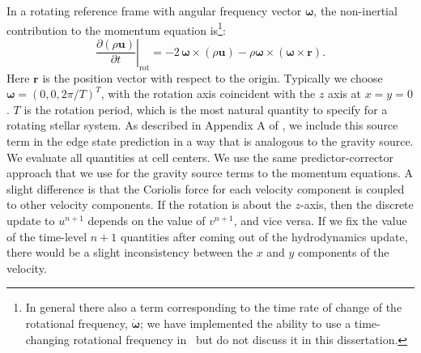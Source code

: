\documentclass[12pt]{article}
\begin{document}
In a rotating reference frame with angular frequency vector $\bm{\omega}$,
the non-inertial contribution to the momentum equation is\footnote{In general there
also a term corresponding to the time rate of change of the rotational frequency,
$\dot{\bm{\omega}}$; we have implemented the ability to use a time-changing
rotational frequency in \castro\ but do not discuss it in this dissertation.}:
\begin{equation}
  \left.\frac{\partial(\rho \mathbf{u})}{\partial t}\right|_{\text{rot}} = -2\, {\bm\omega} \times (\rho\mathbf{u}) - \rho {\bm\omega} \times \left({\bm\omega} \times \mathbf{r}\right).
\end{equation}
Here $\mathbf{r}$ is the position vector with respect to the origin. Typically we choose $\bm{\omega} = (0, 0, 2\pi / T)^T$,
with the rotation axis coincident with the $z$ axis at $x = y = 0$.
$T$ is the rotation period, which is the most natural quantity to specify
for a rotating stellar system. As described in Appendix A of \cite{wdmergerI}, we include this source term
in the edge state prediction in a way that is analogous to the gravity source.
We evaluate all quantities at cell centers. We use the same predictor-corrector
approach that we use for the gravity source terms to the momentum equations. A slight
difference is that the Coriolis force for each velocity component is coupled to other velocity
components. If the rotation is about the $z$-axis, then the discrete update to
$u^{n+1}$ depends on the value of $v^{n+1}$, and vice versa. If we fix the value of
the time-level $n+1$ quantities after coming out of the hydrodynamics update, there
would be a slight inconsistency between the $x$ and $y$ components of the velocity.
\end{document}
